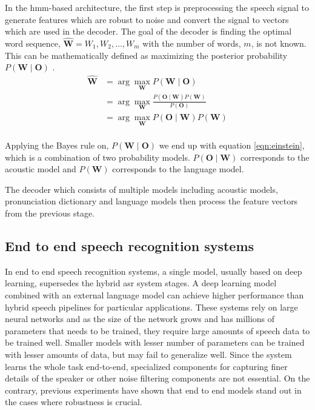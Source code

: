 In the \acrshort{hmm}-based architecture, the first step is preprocessing the speech signal to generate features which are robust to noise and convert the signal to vectors which are used in the decoder\cite{Mukhedkar2014RobustEnvironments}. The goal of the decoder is finding the optimal word sequence, $\hat{\boldsymbol{W}}=W_{1}, W_{2}, \ldots, W_{m}$ with the number of words, $m$, is not known. This can be mathematically defined as maximizing the posterior probability $P(\boldsymbol{W} \mid \boldsymbol{O})$ \cite{Mansikkaniemi2010AcousticService}.
$$
\begin{aligned}
\hat{\boldsymbol{W}} &=\arg \max _{\boldsymbol{W}} P(\boldsymbol{W} \mid \boldsymbol{O}) \\
 &=\arg \max _{\boldsymbol{W}} \frac{P(\boldsymbol{O} \mid \boldsymbol{W}) P(\boldsymbol{W})}{P(\boldsymbol{O})} \\
 &=\arg \max _{\boldsymbol{W}} P(\boldsymbol{O} \mid \boldsymbol{W}) P(\boldsymbol{W}) \label{eqn:einstein} 
\\ 
\end{aligned}
$$

Applying the Bayes rule on, $P(\boldsymbol{W} \mid \boldsymbol{O})$ we end up with equation \eqref{eqn:einstein}, which is a combination of two probability models. $P(\boldsymbol{O} \mid \boldsymbol{W})$ corresponds to the acoustic model and $P(\boldsymbol{W})$ corresponds to the language model\cite{Ney1999DynamicRecognition}.

The decoder which consists of multiple models including acoustic models, pronunciation dictionary and language models then process the feature vectors from the previous stage.

\subsection{End to end speech recognition systems}
\label{section:e2easr}
In end to end speech recognition systems, a single model, usually based on deep learning, supersedes the hybrid \acrshort{asr} system stages. A deep learning model combined with an external language model can achieve higher performance than hybrid speech pipelines for particular applications\cite{Deshmukh2020ComparisonRecognition}. These systems rely on large neural networks and as the size of the network grows and has millions of parameters that needs to be trained, they require large amounts of speech data to be trained well. Smaller models with lesser number of parameters can be trained with lesser amounts of data, but may fail to generalize well\cite{Tanaka2021End-to-EndLearning}. Since the system learns the whole task end-to-end, specialized components for capturing finer details of the speaker or other noise filtering components are not essential. On the contrary, previous experiments have shown that end to end models stand out in the cases where robustness is crucial\cite{Hannun2014DeepRecognition}. 

